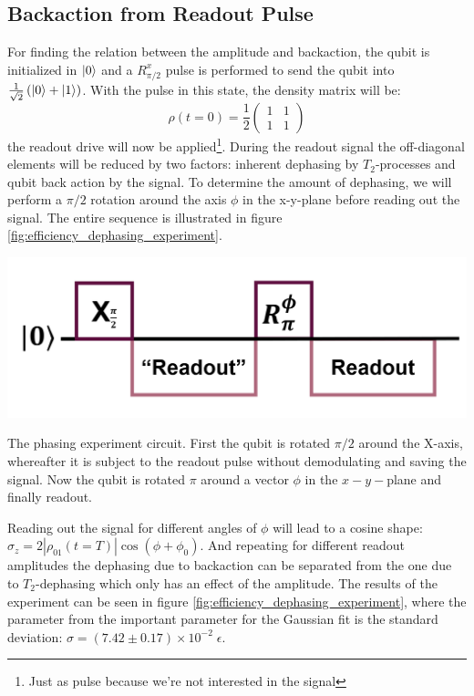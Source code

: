 \subsection{Backaction from Readout Pulse}
For finding the relation between the amplitude and backaction, the qubit is initialized in $\ket{0}$ and a $R^x_{\pi/2}$ pulse is performed to send the qubit into $\frac{1}{\sqrt{2}}\left(\ket{0} + \ket{1}\right)$. With the pulse in this state, the density matrix will be:
\begin{equation}
    \rho(t=0) = \frac12 \begin{pmatrix}1 & 1 \\ 1 & 1\end{pmatrix}
\end{equation}
the readout drive will now be applied\footnote{Just as pulse because we're not interested in the signal}. During the readout signal the off-diagonal elements will be reduced by two factors: inherent dephasing by $T_2$-processes and qubit back action by the signal. To determine the amount of dephasing, we will perform a $\pi/2$ rotation around the axis $\phi$ in the x-y-plane before reading out the signal. The entire sequence is illustrated in figure \ref{fig:efficiency_dephasing_experiment}.

\begin{marginfigure}
    \centering
    \includegraphics[]{Figs/circuits/dephasing.png}
    \caption{The phasing experiment circuit. First the qubit is rotated $\pi/2$ around the X-axis, whereafter it is subject to the readout pulse without demodulating and saving the signal. Now the qubit is rotated $\pi$ around a vector $\phi$ in the $x-y-$plane and finally readout.}
    \label{fig:efficiency_dephasing_experiment}
\end{marginfigure}

Reading out the signal for different angles of $\phi$ will lead to a cosine shape: $\sigma_z = 2 |\rho_{01}(t= T)| \cos(\phi+\phi_0)$. And repeating for different readout amplitudes the dephasing due to backaction can be separated from the one due to $T_2$-dephasing which only has an effect of the amplitude. The results of the experiment can be seen in figure \ref{fig:efficiency_dephasing_experiment}, where the parameter from the important parameter for the Gaussian fit is the standard deviation: $\sigma = (7.42 \pm 0.17) \times 10^{-2} \; \epsilon$. 

